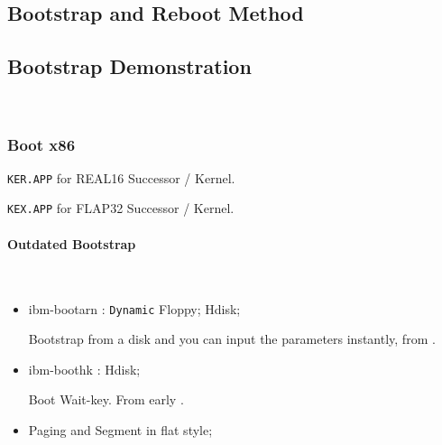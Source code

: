 \subsection{Bootstrap and Reboot Method}


\subsection{Bootstrap Demonstration} \

\subsubsection{Boot x86}

\verb`KER.APP` for REAL16 Successor / Kernel.

\verb`KEX.APP` for FLAP32 Successor / Kernel.

\paragraph{Outdated Bootstrap} \
\begin{itemize}
\item ibm-bootarn : \verb|Dynamic| Floppy; Hdisk;

	Bootstrap from a disk and you can input the parameters instantly, from .
\item ibm-boothk \B{Media}: Hdisk;

	Boot Wait-key. From early .
\end{itemize}



\begin{itemize}
	\item Paging and Segment in flat style;
\end{itemize}
